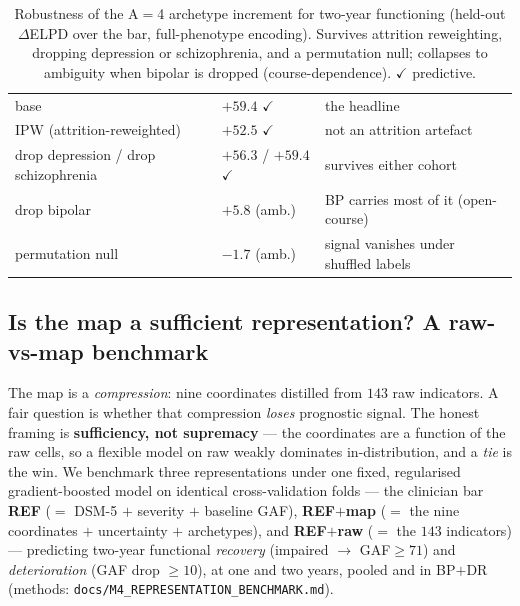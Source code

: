 \begin{table}[h]\centering\small\sffamily
\caption{Robustness of the A$=$4 archetype increment for two-year functioning (held-out $\Delta$ELPD over
the bar, full-phenotype encoding). Survives attrition reweighting, dropping depression or schizophrenia,
and a permutation null; collapses to ambiguity when bipolar is dropped (course-dependence). $\checkmark$
predictive.}
\label{tab:m4robust}
\begin{tabular}{L{5.6cm} R{3.0cm} L{3.4cm}}
\toprule
{} &  & \\
\midrule
{} base & $+59.4$ $\checkmark$ & the headline\\
IPW (attrition-reweighted) & $+52.5$ $\checkmark$ & not an attrition artefact\\
 drop depression / drop schizophrenia & $+56.3$ / $+59.4$ $\checkmark$ & survives either cohort\\
drop bipolar & $+5.8$ (amb.) & BP carries most of it (open-course)\\
 permutation null & $-1.7$ (amb.) & signal vanishes under shuffled labels\\
\bottomrule
\end{tabular}
\end{table}

\subsection{Is the map a sufficient representation? A raw-vs-map benchmark}
\label{sub:m4repbench}
The map is a \emph{compression}: nine coordinates distilled from $143$ raw indicators. A fair question is
whether that compression \emph{loses} prognostic signal. The honest framing is \textbf{sufficiency, not
supremacy} --- the coordinates are a function of the raw cells, so a flexible model on raw weakly dominates
in-distribution, and a \emph{tie} is the win. We benchmark three representations under one fixed, regularised
gradient-boosted model on identical cross-validation folds --- the clinician bar \textbf{REF} ($=$ DSM-5 $+$
severity $+$ baseline GAF), \textbf{REF$+$map} ($=$ the nine coordinates $+$ uncertainty $+$ archetypes), and
\textbf{REF$+$raw} ($=$ the $143$ indicators) --- predicting two-year functional \emph{recovery}
(impaired $\to$ GAF$\ge 71$) and \emph{deterioration} (GAF drop $\ge 10$), at one and two years, pooled and in
BP$+$DR (methods: \texttt{docs/M4\_REPRESENTATION\_BENCHMARK.md}).

